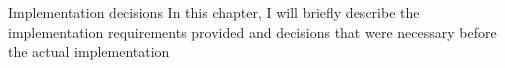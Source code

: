 \chap Implementation decisions
In this chapter, I will briefly describe the implementation requirements provided and decisions that were necessary before the actual implementation